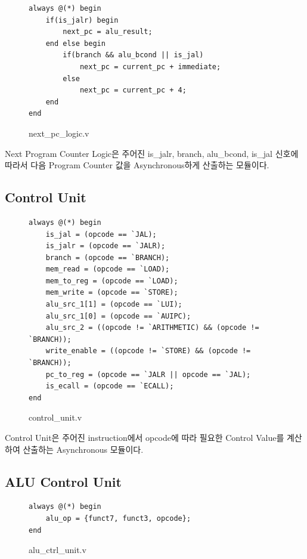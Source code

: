 \documentclass[openright, a4paper]{article}
\begin{document}
\begin{figure}[h]
    \begin{verbatim}
always @(*) begin
    if(is_jalr) begin
        next_pc = alu_result;
    end else begin
        if(branch && alu_bcond || is_jal)
            next_pc = current_pc + immediate;
        else
            next_pc = current_pc + 4;
    end
end
    \end{verbatim}
    \caption{next_pc_logic.v}
\end{figure}

Next Program Counter Logic은 주어진 is_jalr, branch, alu_bcond, is_jal 신호에 따라서 다음 Program Counter 값을 Asynchronous하게 산출하는 모듈이다.

\subsection{Control Unit}

\begin{figure}[!h]
    \begin{verbatim}
always @(*) begin
    is_jal = (opcode == `JAL);
    is_jalr = (opcode == `JALR);
    branch = (opcode == `BRANCH);
    mem_read = (opcode == `LOAD);
    mem_to_reg = (opcode == `LOAD);
    mem_write = (opcode == `STORE);
    alu_src_1[1] = (opcode == `LUI);
    alu_src_1[0] = (opcode == `AUIPC);
    alu_src_2 = ((opcode != `ARITHMETIC) && (opcode != `BRANCH));
    write_enable = ((opcode != `STORE) && (opcode != `BRANCH));
    pc_to_reg = (opcode == `JALR || opcode == `JAL);
    is_ecall = (opcode == `ECALL);
end
    \end{verbatim}
    \caption{control_unit.v}
\end{figure}

Control Unit은 주어진 instruction에서 opcode에 따라 필요한 Control Value를 계산하여 산출하는 Asynchronous 모듈이다.

\subsection{ALU Control Unit}

\begin{figure}[!h]
    \begin{verbatim}
always @(*) begin
    alu_op = {funct7, funct3, opcode};
end
    \end{verbatim}
    \caption{alu_ctrl_unit.v}
\end{figure}
\end{document}
